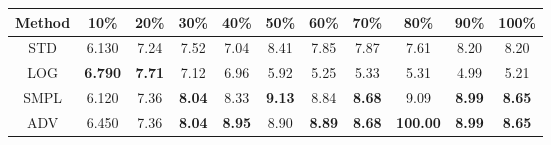 \documentclass{standalone}
\begin{document}
\begin{tabular}{c|cccccccccc}
      \toprule
      Method & 10\% & 20\% & 30\% & 40\% & 50\% & 60\% & 70\% & 80\% & 90\% & 100\% \\
      \midrule
STD & 6.130 & 7.24 & 7.52 & 7.04 & 8.41 & 7.85 & 7.87 & 7.61 & 8.20 & 8.20\\
LOG & \textbf{6.790} & \textbf{7.71} & 7.12 & 6.96 & 5.92 & 5.25 & 5.33 & 5.31 & 4.99 & 5.21\\
SMPL & 6.120 & 7.36 & \textbf{8.04} & 8.33 & \textbf{9.13} & 8.84 & \textbf{8.68} & 9.09 & \textbf{8.99} & \textbf{8.65}\\
ADV & 6.450 & 7.36 & \textbf{8.04} & \textbf{8.95} & 8.90 & \textbf{8.89} & \textbf{8.68} & \textbf{100.00} & \textbf{8.99} & \textbf{8.65}\\
  \bottomrule
\end{tabular}
\end{document}
